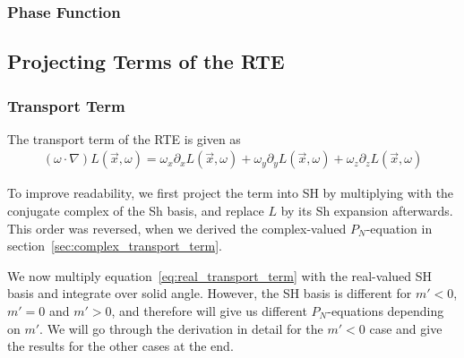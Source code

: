 \documentclass[10pt]{scrartcl}
\begin{document}
\subsubsection{Phase Function}







\subsection{Projecting Terms of the RTE}

\subsubsection{Transport Term}

The transport term of the RTE is given as
\begin{align}
(\omega\cdot\nabla)L(\vec{x}, \omega)
=
\omega_{x}\partial_xL\left (\vec{x} ,\omega \right )+\omega_{y}\partial_yL\left (\vec{x} ,\omega \right )+\omega_{z}\partial_zL\left (\vec{x} ,\omega \right )
\label{eq:real_transport_term}
\end{align}

To improve readability, we first project the term into SH by multiplying with the conjugate complex of the Sh basis, and replace $L$ by its Sh expansion afterwards. This order was reversed, when we derived the complex-valued $P_N$-equation in section~\ref{sec:complex_transport_term}.

We now multiply equation~\ref{eq:real_transport_term} with the real-valued SH basis and integrate over solid angle. However, the SH basis is different for $m'<0$, $m'=0$ and $m'>0$, and therefore will give us different $P_N$-equations depending on $m'$. We will go through the derivation in detail for the $m'<0$ case and give the results for the other cases at the end.
\end{document}
